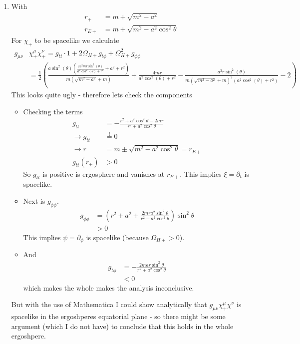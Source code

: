 \documentclass[10pt,a4paper]{article}
\theoremstyle{definition}
\begin{document}
\begin{enumerate}
\item With 
\begin{align}
r_+&=m+\sqrt{m^2-a^2}\\
r_{E+}&=m+\sqrt{m^2-a^2\cos^2\theta}
\end{align}
For $\chi_+$ to be spacelike we calculate
\begin{align}
g_{\mu\nu}&\chi^\mu_+\chi^\nu_+
=g_{tt}\cdot 1+2\Omega_{H+}g_{t\phi}+\Omega_{H+}^2g_{\phi\phi}\\
&=\frac{1}{2} \left(\frac{a \sin ^2(\theta ) \left(\frac{2 a^2 m r \sin ^2(\theta )}{a^2 \cos ^2(\theta
   )+r^2}+a^2+r^2\right)}{m \left(\sqrt{m^2-a^2}+m\right)}+\frac{4 m r}{a^2 \cos ^2(\theta
   )+r^2}-\frac{a^3 r \sin ^2(\theta )}{m \left(\sqrt{m^2-a^2}+m\right)^2 \left(a^2 \cos ^2(\theta
   )+r^2\right)}-2\right)
\end{align}
This looks quite ugly - therefore lets check the components
\begin{itemize}
\item Checking the terms
\begin{align}
g_{tt}
&=-\frac{r^2+a^2\cos^2\theta-2mr}{r^2+a^2\cos^2\theta}\\
\rightarrow g_{tt}&\overset{!}{=}0\\
\rightarrow r&=m\pm\sqrt{m^2-a^2\cos^2\theta}=r_{E+}\\
g_{tt}(r_+)&>0
\end{align}
So $g_{tt}$ is positive is ergosphere and vanishes at $r_{E+}$. This implies $\xi=\partial_t$ is spacelike.
\item Next is $g_{\phi\phi}$. 
\begin{align}
g_{\phi\phi}
&=\left(r^2+a^2+\frac{2mra^2\sin^2\theta}{r^2 + a^2 \cos^2\theta}\right)\sin^2\theta\\
&>0
\end{align}
This implies $\psi=\partial_\phi$ is spacelike (because $\Omega_{H+}>0$).
\item And
\begin{align}
g_{t\phi}
&=-\frac{2mar\sin^2\theta}{r^2 + a^2 \cos^2\theta}\\
&<0
\end{align}
which makes the whole makes the analysis inconclusive.
\end{itemize}
But with the use of Mathematica I could show analytically that $g_{\mu\nu}\chi^\mu_+\chi^\nu$ is spacelike in the ergoshperes equatorial plane - so there might be some argument (which I do not have) to conclude that this holds in the whole ergoshpere.


\end{enumerate}
\end{document}
